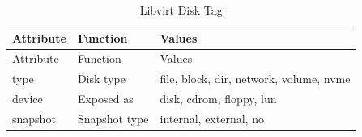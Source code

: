 \documentclass[
  14pt,
  english,
  a4paper,
]{scrreprt}
\begin{document}
\hypertarget{tbl:lvirt_disk_tag}{}
\begin{longtable}[]{@{}lll@{}}
\caption{\label{tbl:lvirt_disk_tag}Libvirt Disk Tag}\tabularnewline
\toprule
\begin{minipage}[b]{0.15\columnwidth}\raggedright
Attribute\strut
\end{minipage} & \begin{minipage}[b]{0.20\columnwidth}\raggedright
Function\strut
\end{minipage} & \begin{minipage}[b]{0.53\columnwidth}\raggedright
Values\strut
\end{minipage}\tabularnewline
\midrule
\endfirsthead
\toprule
\begin{minipage}[b]{0.15\columnwidth}\raggedright
Attribute\strut
\end{minipage} & \begin{minipage}[b]{0.20\columnwidth}\raggedright
Function\strut
\end{minipage} & \begin{minipage}[b]{0.53\columnwidth}\raggedright
Values\strut
\end{minipage}\tabularnewline
\midrule
\endhead
\begin{minipage}[t]{0.15\columnwidth}\raggedright
type\strut
\end{minipage} & \begin{minipage}[t]{0.20\columnwidth}\raggedright
Disk type\strut
\end{minipage} & \begin{minipage}[t]{0.53\columnwidth}\raggedright
file, block, dir, network, volume, nvme\strut
\end{minipage}\tabularnewline
\begin{minipage}[t]{0.15\columnwidth}\raggedright
device\strut
\end{minipage} & \begin{minipage}[t]{0.20\columnwidth}\raggedright
Exposed as\strut
\end{minipage} & \begin{minipage}[t]{0.53\columnwidth}\raggedright
disk, cdrom, floppy, lun\strut
\end{minipage}\tabularnewline
\begin{minipage}[t]{0.15\columnwidth}\raggedright
snapshot\strut
\end{minipage} & \begin{minipage}[t]{0.20\columnwidth}\raggedright
Snapshot type\strut
\end{minipage} & \begin{minipage}[t]{0.53\columnwidth}\raggedright
internal, external, no\strut
\end{minipage}\tabularnewline
\bottomrule
\end{longtable}
\end{document}
